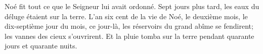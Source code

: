 Noé fit tout ce que le Seigneur lui avait ordonné.
Sept jours plus tard, les eaux du déluge étaient sur la terre.
L’an six cent de la vie de Noé, le deuxième mois, le dix-septième jour du mois,
	ce jour-là, les réservoirs du grand abîme se fendirent;
	les vannes des cieux s’ouvrirent.
Et la pluie tomba sur la terre pendant quarante jours et quarante nuits.
